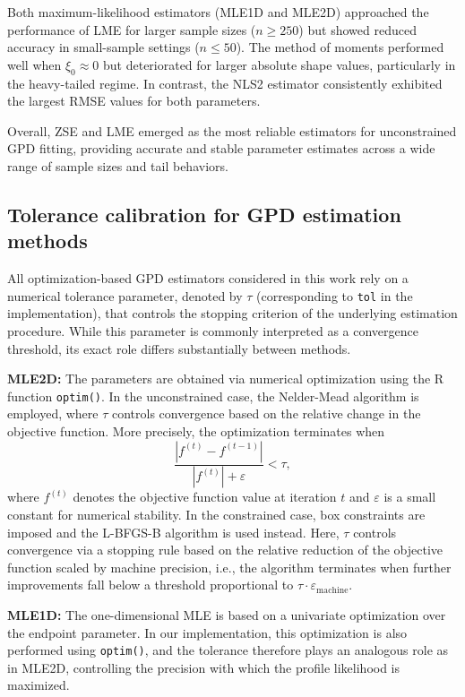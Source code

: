 Both maximum-likelihood estimators (MLE1D and MLE2D) approached the performance of LME for larger sample sizes ($n \geq 250$) but showed reduced accuracy in small-sample settings ($n \leq 50$). 
The method of moments performed well when $\xi_0 \approx 0$ but deteriorated for larger absolute shape values, particularly in the heavy-tailed regime. 
In contrast, the NLS2 estimator consistently exhibited the largest RMSE values for both parameters.

Overall, ZSE and LME emerged as the most reliable estimators for unconstrained GPD fitting, providing accurate and stable parameter estimates across a wide range of sample sizes and tail behaviors.

\subsection{Tolerance calibration for GPD estimation methods}
\label{sec:6perm:param_est:tol}

All optimization-based GPD estimators considered in this work rely on a numerical tolerance parameter, denoted by $\tau$ (corresponding to \texttt{tol} in the implementation), that controls the stopping criterion of the underlying estimation procedure. While this parameter is commonly interpreted as a convergence threshold, its exact role differs substantially between methods. 

\textbf{MLE2D:} The parameters are obtained via numerical optimization using the R function \texttt{optim()}. In the unconstrained case, the Nelder-Mead algorithm is employed, where $\tau$ controls convergence based on the relative change in the objective function. More precisely, the optimization terminates when
\begin{equation}
\frac{|f^{(t)} - f^{(t-1)}|}{|f^{(t)}| + \varepsilon} < \tau,
\end{equation}
where $f^{(t)}$ denotes the objective function value at iteration $t$ and $\varepsilon$ is a small constant for numerical stability. In the constrained case, box constraints are imposed and the L-BFGS-B algorithm is used instead. Here, $\tau$ controls convergence via a stopping rule based on the relative reduction of the objective function scaled by machine precision, i.e., the algorithm terminates when further improvements fall below a threshold proportional to $\tau \cdot \varepsilon_{\text{machine}}$.

\textbf{MLE1D:} The one-dimensional MLE is based on a univariate optimization over the endpoint parameter. In our implementation, this optimization is also performed using \texttt{optim()}, and the tolerance therefore plays an analogous role as in MLE2D, controlling the precision with which the profile likelihood is maximized.

